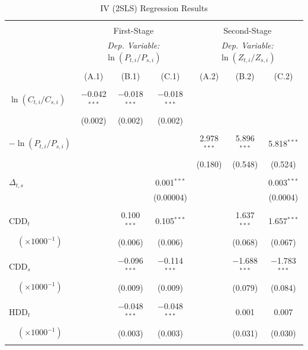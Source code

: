 \documentclass[11pt,a4paper]{extarticle}
\begin{document}
\begin{table}[!t] \centering 
	\caption{IV (2SLS) Regression Results}
	\label{table:2} 
	\small
	\begin{tabular}{@{\extracolsep{4pt}}lcccccc} 
		\\[-4ex]\hline  
		\hline \\[-1.6ex] 
		& \multicolumn{3}{c}{First-Stage} & \multicolumn{3}{c}{Second-Stage} \\ [0.5ex]
		& \multicolumn{3}{c}{\textit{Dep. Variable:} $\ln (P_{t,i} / P_{s,i})$ } & \multicolumn{3}{c}{\textit{Dep. Variable:}  $\ln (Z_{ t, i} / Z_{ s, i})$}\\ [0.5ex]
		\cmidrule(lr){2-4} \cmidrule(lr){5-7}\\[-2.2ex] 
		& (A.1) & (B.1) & (C.1) & (A.2) & (B.2) & (C.2)\\ [0.5ex]
		\hline \\[-1.8ex] 
		$ \ln (C_{t,i} / C_{s,i})$ & $-$0.042$^{***}$ & $-$0.018$^{***}$ & $-$0.018$^{***}$ &  &  &  \\ 
		& (0.002) & (0.002) & (0.002) &  &  &  \\ 
		& & & & & & \\ 
		$-\ln (P_{t,i} / P_{s,i})$ &  &  &  & 2.978$^{***}$ & 5.896$^{***}$ & 5.818$^{***}$ \\ 
		 &  &  &  & (0.180) & (0.548) & (0.524) \\ 
		& & & & & & \\ 
		$\Delta_{t,s}$  &  &  & 0.001$^{***}$ &  &  & 0.003$^{***}$ \\ 
		 &  &  & (0.00004) &  &  & (0.0004) \\ 
		& & & & & & \\ 
		CDD$_t$  &  & 0.100$^{***}$ & 0.105$^{***}$ &  & 1.637$^{***}$ & 1.657$^{***}$ \\ 
		$\quad(\times 1000^{-1})$ &  & (0.006) & (0.006) &  & (0.068) & (0.067) \\ 
		& & & & & & \\ 
		CDD$_s$ &  & $-$0.096$^{***}$ & $-$0.114$^{***}$ &  & $-$1.688$^{***}$ & $-$1.783$^{***}$ \\ 
		$\quad(\times 1000^{-1})$  &  & (0.009) & (0.009) &  & (0.079) & (0.084) \\ 
		& & & & & & \\ 
		HDD$_t$  &  & $-$0.048$^{***}$ & $-$0.048$^{***}$ &  & 0.001 & 0.007 \\ 
		$\quad(\times 1000^{-1})$ &  & (0.003) & (0.003) &  & (0.031) & (0.030) \\ 
		& & & & & & \\ 

\end{tabular}
\end{table}
\end{document}
